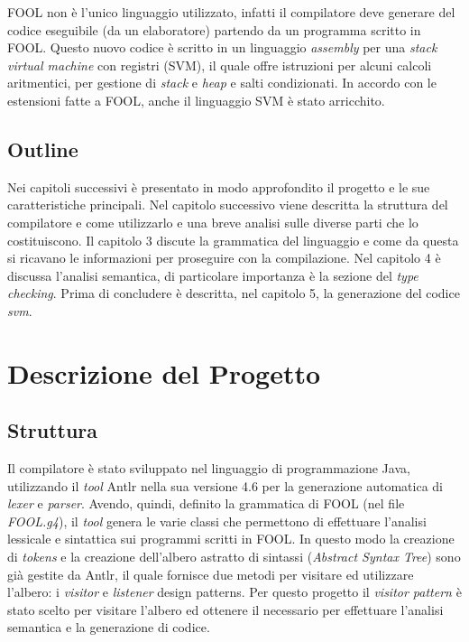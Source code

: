 \documentclass{scrreprt}
\begin{document}
FOOL non è l'unico linguaggio utilizzato, infatti il compilatore deve generare del codice eseguibile (da un elaboratore) partendo da un programma scritto in FOOL. Questo nuovo codice è scritto in un linguaggio \textit{assembly} per una \textit{stack virtual machine} con registri (SVM), il quale offre istruzioni per alcuni calcoli aritmentici, per gestione di \textit{stack} e \textit{heap} e salti condizionati. In accordo con le estensioni fatte a FOOL, anche il linguaggio SVM è stato arricchito.

\section{Outline}
Nei capitoli successivi è presentato in modo approfondito il progetto e le sue caratteristiche principali. Nel capitolo successivo viene descritta la struttura del compilatore e come utilizzarlo e una breve analisi sulle diverse parti che lo costituiscono. Il capitolo 3 discute la grammatica del linguaggio e come da questa si ricavano le informazioni per proseguire con la compilazione. Nel capitolo 4 è discussa l'analisi semantica, di particolare importanza è la sezione del \textit{type checking}. Prima di concludere è descritta, nel capitolo 5, la generazione del codice \textit{svm}.

\chapter{Descrizione del Progetto}
\section{Struttura}
Il compilatore è stato sviluppato nel linguaggio di programmazione Java, utilizzando il \textit{tool} Antlr nella sua versione 4.6 per la generazione automatica di \textit{lexer} e \textit{parser}.
Avendo, quindi, definito la grammatica di FOOL (nel file \textit{FOOL.g4}), il \textit{tool} genera le varie classi che permettono di effettuare l'analisi lessicale e sintattica sui programmi scritti in FOOL.
In questo modo la creazione di \textit{tokens} e la creazione dell'albero astratto di sintassi (\textit{Abstract Syntax Tree}) sono già gestite da Antlr, il quale fornisce due metodi per visitare ed utilizzare l'albero: i \textit{visitor} e \textit{listener} design patterns.
Per questo progetto il \textit{visitor pattern} è stato scelto per visitare l'albero ed ottenere il necessario per effettuare l'analisi semantica e la generazione di codice.\\
\end{document}
